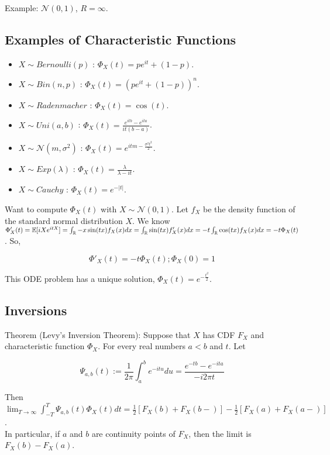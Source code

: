 \documentclass[english, 11pt]{article}
\begin{document}
Example: $\mathcal{N}(0, 1)$, $R = \infty$.\\

\subsection{Examples of Characteristic Functions}

\begin{itemize}
	\item $X \sim Bernoulli(p)$ : $\Phi_X(t) = pe^{it} + (1-p)$.
	\item $X \sim Bin(n, p)$ : $\Phi_X(t) = (pe^{it} + (1 - p))^n$.
	\item $X \sim Radenmacher$ : $\Phi_X(t) = \cos(t)$.
	\item $X \sim Uni(a, b)$ : $\Phi_X(t) = \frac{e^{itb} - e^{ita}}{it(b-a)}$.
	\item $X \sim \mathcal{N}(m, \sigma^2)$ : $\Phi_X(t) = e^{itm - \frac{\sigma^2 t^2}{2}}$.
	\item $X \sim Exp(\lambda)$ : $\Phi_X(t) = \frac{\lambda}{\lambda - it}$.
	\item $X \sim Cauchy$ : $\Phi_X(t) = e^{-|t|}$.
\end{itemize}

Want to compute $\Phi_X(t)$ with $X \sim \mathcal{N}(0, 1)$. Let $f_X$ be the density function of the standard normal distribution $X$. We know $\Phi'_X(t) = \mathbb{E}[iX e^{itX}] = \int_{{\mathbb{R}}} - x\sin(tx) f_X(x)dx = \int_{{\mathbb{R}}} \sin(tx) f'_X(x)dx = -t\int_{{\mathbb{R}}} \cos(tx)f_X(x)dx = -t \Phi_X(t)$. So,

\[\Phi'_X(t) = -t\Phi_X(t); \Phi_X(0) = 1\]

This ODE problem has a unique solution, $\Phi_X(t) = e^{-\frac{t^2}{2}}$.

\subsection{Inversions}
Theorem (Levy's Inversion Theorem):
Suppose that $X$ has CDF $F_X$ and characteristic function $\Phi_X$. For every real numbers $a < b$ and $t$. Let

\[\Psi_{a, b}(t) := \frac{1}{2\pi} \int_a^b e^{-itu} du = \frac{e^{-tb} - e^{-ita}}{-i2\pi t}\]

Then $\lim_{T \to \infty} \int_{-T}^T \Psi_{a, b}(t) \Phi_X(t)dt = \frac{1}{2}[F_X(b) + F_X(b-)] - \frac{1}{2}[F_X(a) + F_X(a-)]$.\\

In particular, if $a$ and $b$ are continuity points of $F_X$, then the limit is $F_X(b) - F_X(a)$.\\
\end{document}
